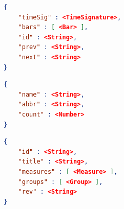 \documentclass[letterpaper,12pt]{article}
\begin{document}
\begin{lstlisting}[language=json, caption=Measure]
{
    "timeSig" : <TimeSignature>,
    "bars" : [ <Bar> ],
    "id" : <String>,
    "prev" : <String>,
    "next" : <String>
}
\end{lstlisting}

\begin{lstlisting}[language=json, caption=Group]
{
    "name" : <String>,
    "abbr" : <String>,
    "count" : <Number>
}
\end{lstlisting}

\begin{lstlisting}[language=json, caption=MusicScore]
{
    "id" : <String>,
    "title" : <String>,
    "measures" : [ <Measure> ],
    "groups" : [ <Group> ],
    "rev" : <String>
}
\end{lstlisting}
\end{document}

